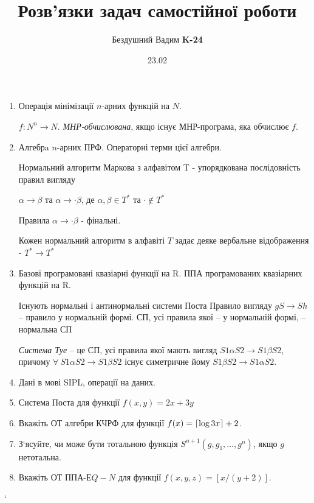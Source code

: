 \documentclass[a4paper, 12pt]{article}
\title{Розв’язки задач самостійної роботи}
\author{Бездушний Вадим \textbf{K-24}}
\date{23.02}
\DeclarePairedDelimiter{\ceil}{\lceil}{\rceil}
\begin{document}
\maketitle
\begin{enumerate}
\item{Операція мінімізації $n$-арних функцій на $N$. \par
\begin{test-answer}
$f : N^{n}\rightarrow N.$ \textit{МНР-обчислювана}, якщо існує МНР-програма, яка
обчислює $f$.
\end{test-answer}
}
\item{Алгебрa $n$-арних ПРФ. Операторні терми цієї алгебри.\par
\begin{test-answer}
Нормальний алгоритм Маркова з алфавітом T - упорядкована послідовність правил вигляду\par
$\alpha \rightarrow \beta $ та 
$\alpha \rightarrow \cdot \beta $, де 
$\alpha, \beta \in T^{*}$ та $\cdot \notin T^{*}$\par
Правила $\alpha \rightarrow \cdot \beta $ - фінальні.\par
Кожен нормальний алгоритм в алфавіті $T$ задає деяке вербальне відображення - $T^{*}\rightarrow T^{*}$
\end{test-answer}
}
\item{Базові програмовані квазіарні функції на R. ППА програмованих квазіарних функцій на R.
\begin{test-answer}
Існують нормальні і антинормальні системи Поста
Правило вигляду $gS\rightarrow Sh$ – правило у нормальній формі.
СП, усі правила якої – у нормальній формі, – нормальна СП\par
\textit{Система Туе} – це СП, усі правила якої мають вигляд $S1\alpha S2 \rightarrow S1 \beta 
S2$, причому $\forall \:S1\alpha S2 \rightarrow S1 \beta S2$ існує симетричне йому $S1\beta S2 \rightarrow S1 \alpha S2$.
\end{test-answer}
\newpage
}
\item{Дані в мові SIPL, операції на даних.}
\item{Система Поста для функції $f(x, y) = 2x+3y$}
\item{Вкажіть ОТ алгебри КЧРФ для функції $f(x) = \ceil{\log{3}{x}}+2$.}
\item{З‘ясуйте, чи може бути тотальною функція $S^{n+1}(g, g_1 , \dots , g^n )$, якщо $g$ нетотальна.}
\item{Вкажіть ОТ ППА-$ЕQ-N$ для функції $f(x, y, z) = [x/(y+2)]$.}
\end{enumerate}`
\end{document}
